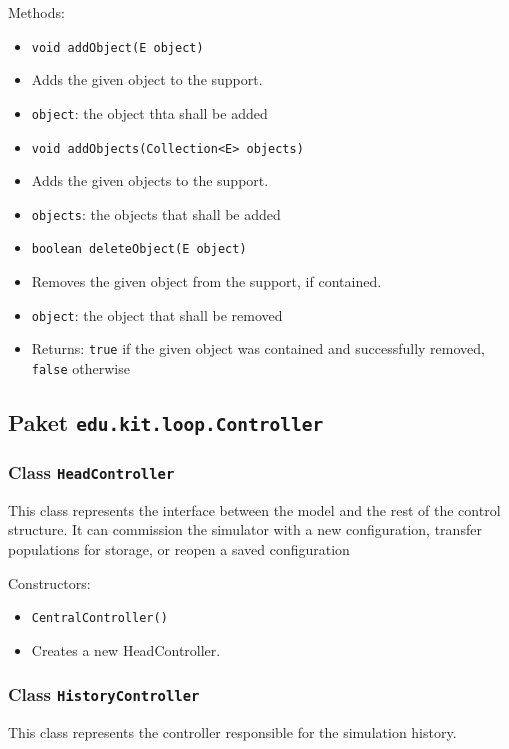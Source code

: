 \documentclass[parskip=full,11pt]{scrartcl}
\begin{document}
Methods:
\begin{itemize}\itemsep -10pt
\item \texttt{void addObject(E object)}
\item[] Adds the given object to the support.
\item[] \texttt{object}: the object thta shall be added

\item \texttt{void addObjects(Collection<E> objects)}
\item[] Adds the given objects to the support.
\item[] \texttt{objects}: the objects that shall be added

\item \texttt{boolean deleteObject(E object)}
\item[] Removes the given object from the support, if contained.
\item[] \texttt{object}: the object that shall be removed
\item[] Returns: \texttt{true} if the given object was contained and successfully removed, \texttt{false} otherwise
\end{itemize}

\subsection{Paket \texttt{edu.kit.loop.Controller}}

\subsubsection{Class \texttt{HeadController}}
This class represents the interface between the model and the rest of the control structure. It can commission the simulator with a new configuration, transfer populations for storage, or reopen a saved configuration

Constructors:
\begin{itemize}\itemsep -10pt
\item \texttt{CentralController()}
\item[] Creates a new HeadController.
\end{itemize}

\subsubsection{Class \texttt{HistoryController}}
This class represents the controller responsible for the simulation history.
\end{document}
